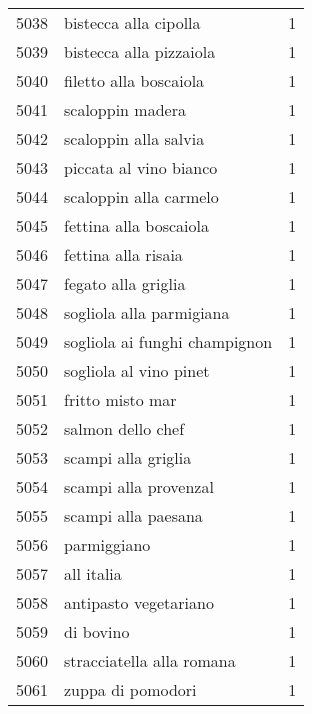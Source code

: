 \begin{tabular}{llr}
5038 &                              bistecca alla cipolla &      1 \\
5039 &                            bistecca alla pizzaiola &      1 \\
5040 &                             filetto alla boscaiola &      1 \\
5041 &                                   scaloppin madera &      1 \\
5042 &                              scaloppin alla salvia &      1 \\
5043 &                             piccata al vino bianco &      1 \\
5044 &                             scaloppin alla carmelo &      1 \\
5045 &                             fettina alla boscaiola &      1 \\
5046 &                                fettina alla risaia &      1 \\
5047 &                                fegato alla griglia &      1 \\
5048 &                           sogliola alla parmigiana &      1 \\
5049 &                      sogliola ai funghi champignon &      1 \\
5050 &                             sogliola al vino pinet &      1 \\
5051 &                                   fritto misto mar &      1 \\
5052 &                                  salmon dello chef &      1 \\
5053 &                                scampi alla griglia &      1 \\
5054 &                              scampi alla provenzal &      1 \\
5055 &                                scampi alla paesana &      1 \\
5056 &                                        parmiggiano &      1 \\
5057 &                                         all italia &      1 \\
5058 &                              antipasto vegetariano &      1 \\
5059 &                                          di bovino &      1 \\
5060 &                          stracciatella alla romana &      1 \\
5061 &                                  zuppa di pomodori &      1 \\

\end{tabular}
